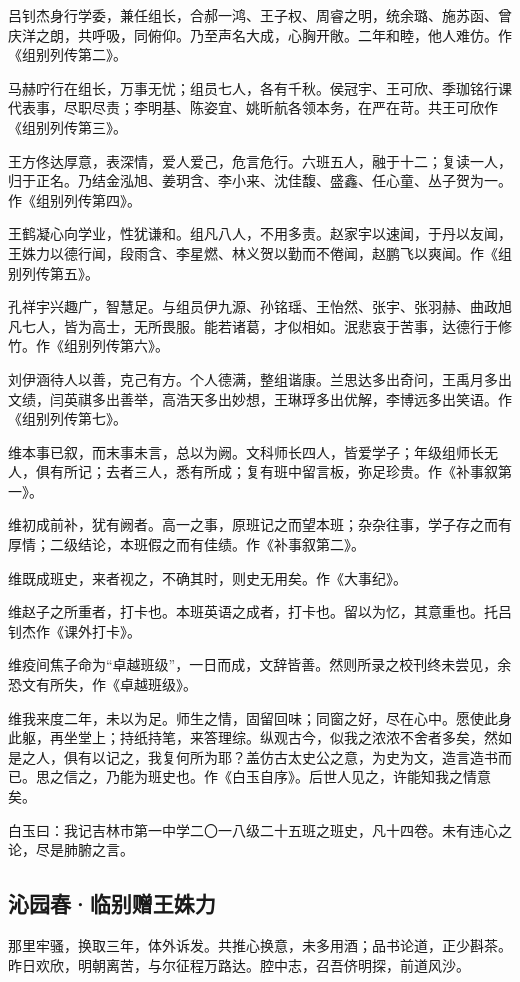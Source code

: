 \documentclass[a5paper]{ctexart}
\begin{document}
	吕钊杰身行学委，兼任组长，合郝一鸿、王子权、周睿之明，统余璐、施苏函、曾庆洋之朗，共呼吸，同俯仰。乃至声名大成，心胸开敞。二年和睦，他人难仿。作《组别列传第二》。
	
	马赫咛行在组长，万事无忧；组员七人，各有千秋。侯冠宇、王可欣、季珈铭行课代表事，尽职尽责；李明基、陈姿宜、姚昕航各领本务，在严在苛。共王可欣作《组别列传第三》。
	
	王方佟达厚意，表深情，爱人爱己，危言危行。六班五人，融于十二；复读一人，归于正名。乃结金泓旭、姜玥含、李小来、沈佳馥、盛鑫、任心童、丛子贺为一。作《组别列传第四》。
	
	王鹤凝心向学业，性犹谦和。组凡八人，不用多责。赵家宇以速闻，于丹以友闻，王姝力以德行闻，段雨含、李星燃、林义贺以勤而不倦闻，赵鹏飞以爽闻。作《组别列传第五》。
	
	孔祥宇兴趣广，智慧足。与组员伊九源、孙铭瑶、王怡然、张宇、张羽赫、曲政旭凡七人，皆为高士，无所畏服。能若诸葛，才似相如。泯悲哀于苦事，达德行于修竹。作《组别列传第六》。
	
	刘伊涵待人以善，克己有方。个人德满，整组谐康。兰思达多出奇问，王禹月多出文绩，闫英祺多出善举，高浩天多出妙想，王琳琈多出优解，李博远多出笑语。作《组别列传第七》。
	
	维本事已叙，而末事未言，总以为阙。文科师长四人，皆爱学子；年级组师长无人，俱有所记；去者三人，悉有所成；复有班中留言板，弥足珍贵。作《补事叙第一》。
	
	维初成前补，犹有阙者。高一之事，原班记之而望本班；杂杂往事，学子存之而有厚情；二级结论，本班假之而有佳绩。作《补事叙第二》。
	
	维既成班史，来者视之，不确其时，则史无用矣。作《大事纪》。
	
	维赵子之所重者，打卡也。本班英语之成者，打卡也。留以为忆，其意重也。托吕钊杰作《课外打卡》。
	
	维疫间焦子命为“卓越班级”，一日而成，文辞皆善。然则所录之校刊终未尝见，余恐文有所失，作《卓越班级》。
	
	维我来度二年，未以为足。师生之情，固留回味；同窗之好，尽在心中。愿使此身此躯，再坐堂上；持纸持笔，来答理综。纵观古今，似我之浓浓不舍者多矣，然如是之人，俱有以记之，我复何所为耶？盖仿古太史公之意，为史为文，造言造书而已。思之信之，乃能为班史也。作《白玉自序》。后世人见之，许能知我之情意矣。
	
	白玉曰：我记吉林市第一中学二〇一八级二十五班之班史，凡十四卷。未有违心之论，尽是肺腑之言。
	
	\subsection{沁园春·临别赠王姝力}
	那里牢骚，换取三年，体外诉发。共推心换意，未多用酒；品书论道，正少斟茶。昨日欢欣，明朝离苦，与尔征程万路达。腔中志，召吾侪明探，前道风沙。 
	
\end{document}
